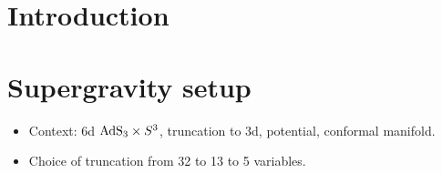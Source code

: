 \documentclass[11pt]{article}
\begin{document}
\tableofcontents



\section{Introduction}

\section{Supergravity setup}
\begin{itemize}[label=\textbullet]
	\item Context: 6d ${\rm AdS}_{3}\times S^{3}$, truncation to 3d, potential, conformal manifold.
	\item Choice of truncation from 32 to 13 to 5 variables.
\end{itemize}
\end{document}
